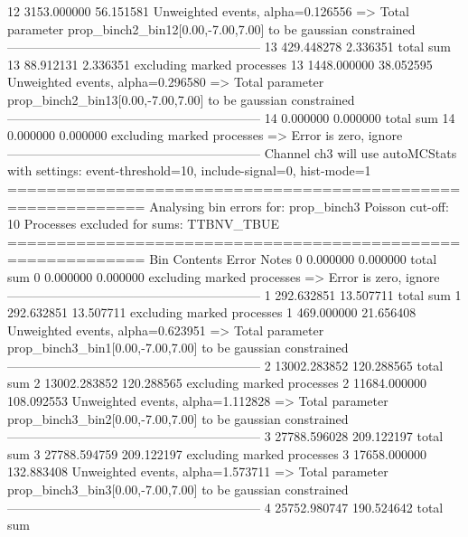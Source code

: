 12         3153.000000     56.151581       Unweighted events, alpha=0.126556
  => Total parameter prop_binch2_bin12[0.00,-7.00,7.00] to be gaussian constrained
------------------------------------------------------------
13         429.448278      2.336351        total sum                     
13         88.912131       2.336351        excluding marked processes    
13         1448.000000     38.052595       Unweighted events, alpha=0.296580
  => Total parameter prop_binch2_bin13[0.00,-7.00,7.00] to be gaussian constrained
------------------------------------------------------------
14         0.000000        0.000000        total sum                     
14         0.000000        0.000000        excluding marked processes    
  => Error is zero, ignore      
------------------------------------------------------------
Channel ch3 will use autoMCStats with settings: event-threshold=10, include-signal=0, hist-mode=1
============================================================
Analysing bin errors for: prop_binch3
Poisson cut-off: 10
Processes excluded for sums: TTBNV_TBUE
============================================================
Bin        Contents        Error           Notes                         
0          0.000000        0.000000        total sum                     
0          0.000000        0.000000        excluding marked processes    
  => Error is zero, ignore      
------------------------------------------------------------
1          292.632851      13.507711       total sum                     
1          292.632851      13.507711       excluding marked processes    
1          469.000000      21.656408       Unweighted events, alpha=0.623951
  => Total parameter prop_binch3_bin1[0.00,-7.00,7.00] to be gaussian constrained
------------------------------------------------------------
2          13002.283852    120.288565      total sum                     
2          13002.283852    120.288565      excluding marked processes    
2          11684.000000    108.092553      Unweighted events, alpha=1.112828
  => Total parameter prop_binch3_bin2[0.00,-7.00,7.00] to be gaussian constrained
------------------------------------------------------------
3          27788.596028    209.122197      total sum                     
3          27788.594759    209.122197      excluding marked processes    
3          17658.000000    132.883408      Unweighted events, alpha=1.573711
  => Total parameter prop_binch3_bin3[0.00,-7.00,7.00] to be gaussian constrained
------------------------------------------------------------
4          25752.980747    190.524642      total sum                     
